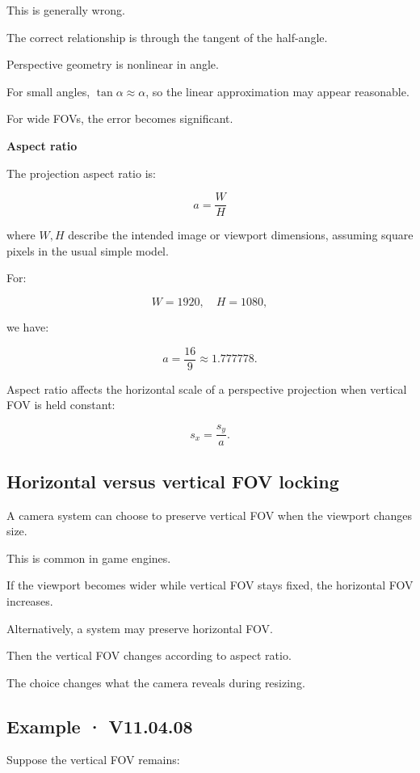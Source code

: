 This is generally wrong.

The correct relationship is through the tangent of the half-angle.

Perspective geometry is nonlinear in angle.

For small angles, \(\tan\alpha\approx\alpha\), so the linear approximation may appear reasonable.

For wide FOVs, the error becomes significant.

\textbf{Aspect ratio}

The projection aspect ratio is:

\[
 \boxed{ a=\frac WH }
\]

where \(W,H\) describe the intended image or viewport dimensions, assuming square pixels in the usual simple model.

For:

\[
 W=1920,\quad H=1080,
\]

we have:

\[
 \boxed{ a=\frac{16}{9}\approx1.777778 }.
\]

Aspect ratio affects the horizontal scale of a perspective projection when vertical FOV is held constant:

\[
 s_x=\frac{s_y}{a}.
\]

\subsection{Horizontal versus vertical FOV locking}\label{02-foundations-ii-ch033-horizontal-versus-vertical-fov-locking}

A camera system can choose to preserve vertical FOV when the viewport changes size.

This is common in game engines.

If the viewport becomes wider while vertical FOV stays fixed, the horizontal FOV increases.

Alternatively, a system may preserve horizontal FOV.

Then the vertical FOV changes according to aspect ratio.

The choice changes what the camera reveals during resizing.

\subsection{Example · V11.04.08}\label{02-foundations-ii-ch033-example-v11.04.08}

Suppose the vertical FOV remains:

